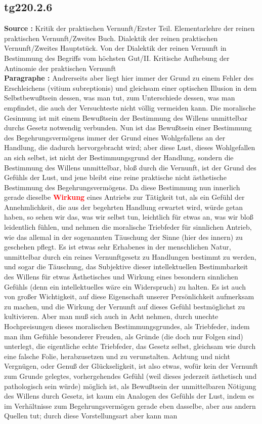 \documentclass[a4paper,12pt,twoside]{book}
\newcommand{\match}[1]{\textcolor{red}{\textbf{#1}}}
\begin{document}
	\subsection*{tg220.2.6} 
	\textbf{Source : }Kritik der praktischen Vernunft/Erster Teil. Elementarlehre der reinen praktischen Vernunft/Zweites Buch. Dialektik der reinen praktischen Vernunft/Zweites Hauptstück. Von der Dialektik der reinen Vernunft in Bestimmung des Begriffs vom höchsten Gut/II. Kritische Aufhebung der Antinomie der praktischen Vernunft\\  
	
	\noindent\textbf{Paragraphe : }Andrerseits aber liegt hier immer der Grund zu einem Fehler des Erschleichens (vitium subreptionis) und gleichsam einer optischen Illusion in dem Selbstbewußtsein dessen, was man tut, zum Unterschiede dessen, was man empfindet, die auch der Versuchteste nicht völlig vermeiden kann. Die moralische Gesinnung ist mit einem Bewußtsein der Bestimmung des Willens unmittelbar durchs Gesetz notwendig verbunden. Nun ist das Bewußtsein einer Bestimmung des Begehrungsvermögens immer der Grund  eines Wohlgefallens an der Handlung, die dadurch hervorgebracht wird; aber diese Lust, dieses Wohlgefallen an sich selbst, ist nicht der Bestimmungsgrund der Handlung, sondern die Bestimmung des Willens unmittelbar, bloß durch die Vernunft, ist der Grund des Gefühls der Lust, und jene bleibt eine reine praktische nicht ästhetische Bestimmung des Begehrungsvermögens. Da diese Bestimmung nun innerlich gerade dieselbe \match{Wirkung} eines Antriebs zur Tätigkeit tut, als ein Gefühl der Annehmlichkeit, die aus der begehrten Handlung erwartet wird, würde getan haben, so sehen wir das, was wir selbst tun, leichtlich für etwas an, was wir bloß leidentlich fühlen, und nehmen die moralische Triebfeder für sinnlichen Antrieb, wie das allemal in der sogenannten Täuschung der Sinne (hier des innern) zu geschehen pflegt. Es ist etwas sehr Erhabenes in der menschlichen Natur, unmittelbar durch ein reines Vernunftgesetz zu Handlungen bestimmt zu werden, und sogar die Täuschung, das Subjektive dieser intellektuellen Bestimmbarkeit des Willens für etwas Ästhetisches und Wirkung eines besondern sinnlichen Gefühls (denn ein intellektuelles wäre ein Widerspruch) zu halten. Es ist auch von großer Wichtigkeit, auf diese Eigenschaft unserer Persönlichkeit aufmerksam zu machen, und die Wirkung der Vernunft auf dieses Gefühl bestmöglichst zu kultivieren. Aber man muß sich auch in Acht nehmen, durch unechte Hochpreisungen dieses moralischen Bestimmungsgrundes, als Triebfeder, indem man ihm Gefühle besonderer Freuden, als Gründe (die doch nur Folgen sind) unterlegt, die eigentliche echte Triebfeder, das Gesetz selbst, gleichsam wie durch eine falsche Folie, herabzusetzen und zu verunstalten. Achtung und nicht Vergnügen, oder Genuß der Glückseligkeit, ist also etwas, wofür kein der Vernunft zum Grunde gelegtes, vorhergehendes Gefühl (weil dieses jederzeit ästhetisch und pathologisch sein würde) möglich ist, als Bewußtsein der unmittelbaren Nötigung des Willens durch Gesetz, ist kaum ein Analogen des Gefühls der Lust, indem es im Verhältnisse zum Begehrungsvermögen gerade eben dasselbe, aber aus andern Quellen  tut; durch diese Vorstellungsart aber kann man 
\end{document}
